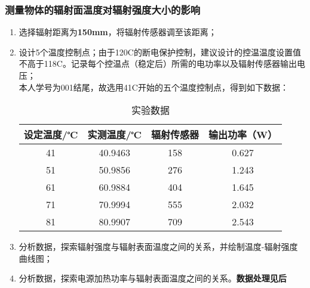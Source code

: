 \documentclass[dvipsnames, svgnames,a4paper,11pt]{article}
\begin{document}
	\subsubsection{测量物体的辐射面温度对辐射强度大小的影响}
	\begin{enumerate}
		\item 选择辐射距离为\textbf{150mm}，将辐射传感器调至该距离；
		\item 设计5个温度控制点；由于120\textdegree C的断电保护控制，建议设计的控温温度设置值不高于118\textdegree C。记录每个控温点（稳定后）所需的电功率以及辐射传感器输出电压；\\
		  本人学号为001结尾，故选用41\textdegree C开始的五个温度控制点，得到如下数据：
		  \begin{table}[h]
			\centering
			\begin{tabular}{|c|c|c|c|}
			\hline
			设定温度/℃ & 实测温度/℃ & 辐射传感器 & 输出功率（W） \\ \hline
			41          & 40.9463     & 158         & 0.627         \\ \hline
			51          & 50.9856     & 276         & 1.243         \\ \hline
			61          & 60.9884     & 404         & 1.645         \\ \hline
			71          & 70.9994     & 555         & 2.032         \\ \hline
			81          & 80.9907     & 709         & 2.543         \\ \hline
			\end{tabular}
			\caption{实验数据}
			\label{tab:temperature_power_data}
			\end{table}
		\item 分析数据，探索辐射强度与辐射表面温度之间的关系，并绘制温度-辐射强度曲线图；
		\item 分析数据，探索电源加热功率与辐射表面温度之间的关系。\textbf{数据处理见后}
	\end{enumerate}
\end{document}

